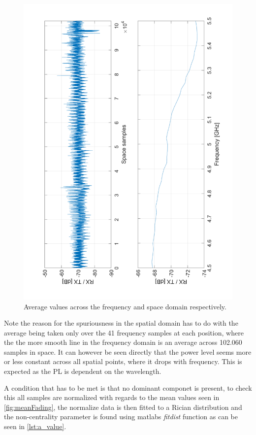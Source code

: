 \begin{figure}[H]
\centering
\includegraphics[height = \textwidth, angle = -90]{figures/meanFading.pdf}
\caption{Average values across the frequency and space domain respectively.}
\label{fig:meanFading}
\end{figure}

Note the reason for the spuriousness in the spatial domain has to do with the average being taken only over the 41 frequency samples at each position, where the the more smooth line in the frequency domain is an average across 102.060 samples in space. It can however be seen directly that the power level seems more or less constant across all spatial points, where it drops with frequency. This is expected as the \gls{PL} is dependent on the wavelength.  

A condition that has to be met is that no dominant componet is present, to check this all samples are normalized with regards to the mean values seen in \autoref{fig:meanFading}, the normalize data is then fitted to a Rician distribution and the non-centrality parameter is found using matlabs \textit{fitdist} function as can be seen in \autoref{lst:a_value}. 

